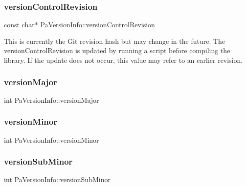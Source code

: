 \subsubsection{\texorpdfstring{version\+Control\+Revision}{versionControlRevision}}
{\footnotesize\ttfamily const char$\ast$ Pa\+Version\+Info\+::version\+Control\+Revision}

This is currently the Git revision hash but may change in the future. The version\+Control\+Revision is updated by running a script before compiling the library. If the update does not occur, this value may refer to an earlier revision. \mbox{\label{struct_pa_version_info_aae9ff4383171955022ebd26c0c0d4d2e}} 
\subsubsection{\texorpdfstring{version\+Major}{versionMajor}}
{\footnotesize\ttfamily int Pa\+Version\+Info\+::version\+Major}

\mbox{\label{struct_pa_version_info_aee2f42cc57f0a018481d73e016722952}} 
\subsubsection{\texorpdfstring{version\+Minor}{versionMinor}}
{\footnotesize\ttfamily int Pa\+Version\+Info\+::version\+Minor}

\mbox{\label{struct_pa_version_info_aa789c4034fc38c91ffecb4f81fc3ae6b}} 
\subsubsection{\texorpdfstring{version\+Sub\+Minor}{versionSubMinor}}
{\footnotesize\ttfamily int Pa\+Version\+Info\+::version\+Sub\+Minor}

\mbox{\label{struct_pa_version_info_ab876696c6563c35fdcb8c18f77ff12f5}} 
